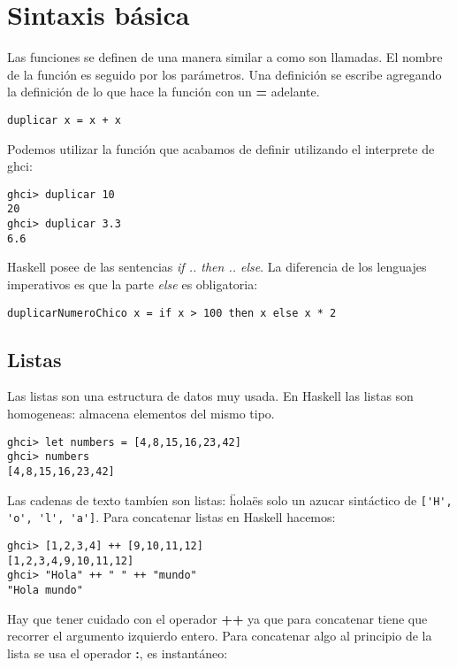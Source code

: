 \section{Sintaxis básica} %
\label{sec:sintaxis_de_funciones}

Las funciones se definen de una manera similar a como son llamadas. El nombre de la función es seguido por los parámetros. Una definición se escribe agregando la definición de lo que hace la función con un \textbf{=} adelante.

\begin{lstlisting}
duplicar x = x + x
\end{lstlisting}

Podemos utilizar la función que acabamos de definir utilizando el interprete de ghci:

\begin{lstlisting}
ghci> duplicar 10
20
ghci> duplicar 3.3
6.6
\end{lstlisting}

Haskell posee de las sentencias \textit{if .. then .. else}. La diferencia de los lenguajes imperativos es que la parte \textit{else} es obligatoria:

\begin{lstlisting}
duplicarNumeroChico x = if x > 100 then x else x * 2
\end{lstlisting}

\subsection{Listas} %
\label{sub:listas}

Las listas son una estructura de datos muy usada. En Haskell las listas son homogeneas: almacena elementos del mismo tipo.

\begin{lstlisting}
ghci> let numbers = [4,8,15,16,23,42]
ghci> numbers
[4,8,15,16,23,42]
\end{lstlisting}

Las cadenas de texto tambíen son listas: \"hola\" es solo un azucar sintáctico de \lstinline$['H', 'o', 'l', 'a']$. Para concatenar listas en Haskell hacemos:

\begin{lstlisting}
ghci> [1,2,3,4] ++ [9,10,11,12]
[1,2,3,4,9,10,11,12]
ghci> "Hola" ++ " " ++ "mundo"
"Hola mundo"
\end{lstlisting}

Hay que tener cuidado con el operador \textbf{++} ya que para concatenar tiene que recorrer el argumento izquierdo entero. Para concatenar algo al principio de la lista se usa el operador \textbf{:}, es instantáneo:

